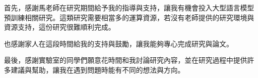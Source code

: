 
\begin{acknowledgement}

    首先，感謝馬老師在研究期間給予我的指導與支持，讓我有機會投入大型語言模型預訓練相關研究。這類研究需要相當多的運算資源，若沒有老師提供的研究環境與資源支持，這份研究很難順利完成。

    也感謝家人在這段時間給我的支持與鼓勵，讓我能夠專心完成研究與論文。

    最後，感謝實驗室的同學們願意花時間和我討論研究內容，並在研究過程中提供許多建議與幫助，讓我在遇到問題時能有不同的想法與方向。

\end{acknowledgement}
